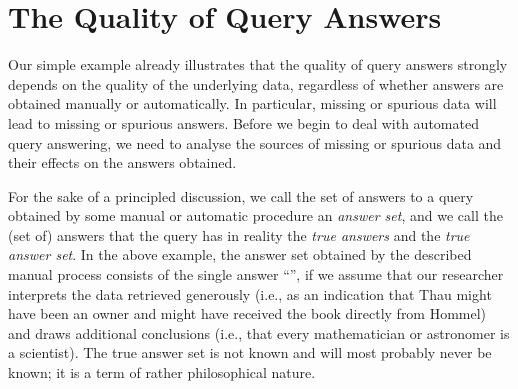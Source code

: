 
\section{The Quality of Query Answers}
\label{sec:quality_of_answers}

Our simple example already illustrates that the quality of query answers
strongly depends on the quality of the underlying data,
regardless of whether answers are obtained manually or automatically. 
In particular, missing or spurious data will lead to missing or spurious answers.
Before we begin to deal with automated query answering,
we need to analyse the sources of missing or spurious data and their effects on the answers obtained.

For the sake of a principled discussion, we call the set of answers to a query obtained by some manual or automatic procedure
an \emph{answer set}, and we call the (set of) answers that the query has in reality the \emph{true answers} and the \emph{true answer set}.
In the above example, the answer set obtained by the described manual process consists of the single answer
\enquote{}, if we assume that our researcher interprets the data retrieved generously
(i.e., as an indication that Thau might have been an owner and might have received the book directly from Hommel)
and draws additional conclusions (i.e., that every mathematician or astronomer is a scientist).
The true answer set is not known and will most probably never be known; it is a term of rather philosophical nature.

